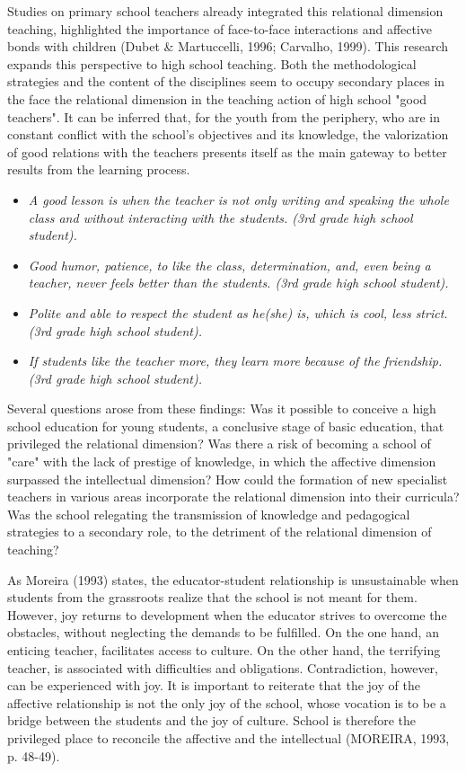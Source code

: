 \documentclass[11pt, a4paper]{article}
\begin{document}
Studies on primary school teachers already integrated this relational dimension teaching, highlighted the importance of
face-to-face interactions and affective bonds with children (Dubet \& Martuccelli, 1996; Carvalho, 1999). This research
expands this perspective to high school teaching. Both the methodological strategies and the content of the disciplines
seem to occupy secondary places in the face the relational dimension in the teaching action of high school "good teachers".
It can be inferred that, for the youth from the periphery, who are in constant conflict with the school's objectives and its
knowledge, the valorization of good relations with the teachers presents itself as the main gateway to better results from
the learning process.

\begin{itemize}
    \item {\it A good lesson is when the teacher is not only writing and speaking the whole class and without interacting with the
    students. (3rd grade high school student).}
    \item {\it Good humor, patience, to like the class, determination, and, even being a teacher, never feels better than the
    students. (3rd grade high school student).}
    \item {\it Polite and able to respect the student as he(she) is, which is cool, less strict. (3rd grade high school student).}
    \item {\it If students like the teacher more, they learn more because of the friendship. (3rd grade high school student).}
\end{itemize}

Several questions arose from these findings: Was it possible to conceive a high school education for young students, a
conclusive stage of basic education, that privileged the relational dimension? Was there a risk of becoming a school of
"care" with the lack of prestige of knowledge, in which the affective dimension surpassed the intellectual dimension?
How could the formation of new specialist teachers in various areas incorporate the relational dimension into their
curricula? Was the school relegating the transmission of knowledge and pedagogical strategies to a secondary role, to the
detriment of the relational dimension of teaching?

As Moreira (1993) states, the educator-student relationship is unsustainable when students from the grassroots realize that
the school is not meant for them. However, joy returns to development when the educator strives to overcome the
obstacles, without neglecting the demands to be fulfilled. On the one hand, an enticing teacher, facilitates access to culture.
On the other hand, the terrifying teacher, is associated with difficulties and obligations. Contradiction, however, can be
experienced with joy. It is important to reiterate that the joy of the affective relationship is not the only joy of the school,
whose vocation is to be a bridge between the students and the joy of culture. School is therefore the privileged place to
reconcile the affective and the intellectual (MOREIRA, 1993, p. 48-49).
\end{document}
